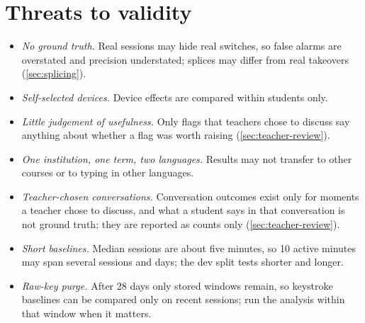 \section{Threats to validity}
\begin{itemize}
  \item \emph{No ground truth.} Real sessions may hide real switches, so false alarms are
    overstated and precision understated; splices may differ from real takeovers
    (\cref{sec:splicing}).
  \item \emph{Self-selected devices.} Device effects are compared within students only.
  \item \emph{Little judgement of usefulness.} Only flags that teachers chose to discuss
    say anything about whether a flag was worth raising (\cref{sec:teacher-review}).
  \item \emph{One institution, one term, two languages.} Results may not transfer to
    other courses or to typing in other languages.
  \item \emph{Teacher-chosen conversations.} Conversation outcomes exist only for moments a
    teacher chose to discuss, and what a student says in that conversation is not ground
    truth; they are reported as counts only (\cref{sec:teacher-review}).
  \item \emph{Short baselines.} Median sessions are about five minutes, so 10 active
    minutes may span several sessions and days; the dev split tests shorter and longer.
  \item \emph{Raw-key purge.} After 28 days only stored windows remain, so keystroke
    baselines can be compared only on recent sessions; run the analysis within that
    window when it matters.
\end{itemize}
